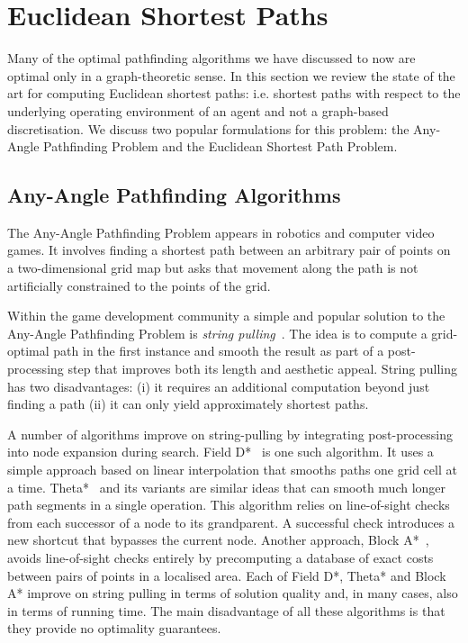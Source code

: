 \section{Euclidean Shortest Paths}
\label{cha::lit::euclidean}
Many of the optimal pathfinding algorithms we have discussed to now are optimal only in 
a graph-theoretic sense. In this section we review the state of the art for computing
Euclidean shortest paths: i.e. shortest paths with respect to the underlying operating 
environment of an agent and not a graph-based discretisation. We discuss two popular
formulations for this problem: the Any-Angle Pathfinding Problem and the Euclidean Shortest
Path Problem. 

\subsection{Any-Angle Pathfinding Algorithms}
\label{cha::lit::euclidean:anyangle}
The Any-Angle Pathfinding Problem appears in robotics and computer video games. It involves finding
a shortest path between an arbitrary pair of points on a two-dimensional grid map but asks that
movement along the path is not artificially constrained to the points of the grid.

Within the game development community a simple and popular solution to the Any-Angle Pathfinding
Problem is \emph{string pulling}~\citep{pinter01,botea04}.  The idea is to compute a grid-optimal
path in the first instance and smooth the result as part of a post-processing step that improves
both its length and aesthetic appeal. String pulling has two disadvantages: (i) it requires an
additional computation beyond just finding a path (ii) it can only yield approximately shortest
paths.

A number of algorithms improve on string-pulling by integrating post-processing into node expansion
during search. Field D*~\citep{ferguson05} is one such algorithm. It uses a simple approach based on
linear interpolation that smooths paths one grid cell at a time.  Theta*~\citep{nash07} and its
variants \citep{nash09,nash10,munoz12} are similar ideas that can smooth much longer path segments in a
single operation. This algorithm relies on line-of-sight checks from each successor of a node to its
grandparent. A successful check introduces a new shortcut that bypasses the current node.  Another
approach, Block A*~\citep{yap11}, avoids line-of-sight checks entirely by precomputing a database of
exact costs between pairs of points in a localised area.  Each of Field D*, Theta* and Block A*
improve on string pulling in terms of solution quality and, in many cases, also in terms of running
time.  The main disadvantage of all these algorithms is that they provide no optimality guarantees.

